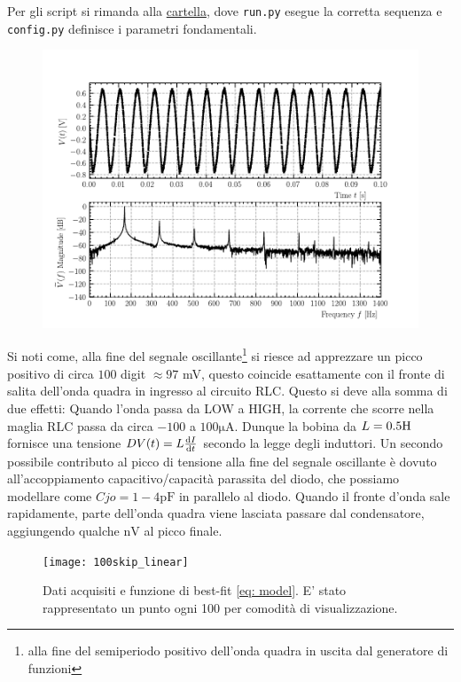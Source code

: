 \documentclass{article}[a4paper, oneside, 11pt]
\begin{document}
Per gli script si rimanda alla 
\href{https://github.com/LucaCiucci/relaz_seme/tree/master/Cartella_fit}
{cartella}, dove \verb+run.py+ esegue la corretta sequenza e \verb+config.py+
definisce i parametri fondamentali.

\begin{figure}[!ht]
\centering
	\includegraphics{phs1_41.pdf}
\label{fig: phs1_41}
\end{figure}
Si noti come, alla fine del segnale oscillante\footnote{alla fine del
semiperiodo positivo dell'onda quadra in uscita dal generatore di funzioni}
si riesce ad apprezzare un picco positivo di circa $100$ digit $\approx 97$ mV,
questo coincide esattamente con il fronte di salita dell'onda quadra in
ingresso al circuito RLC.
Questo si deve alla somma di due effetti: Quando l'onda passa da LOW a
HIGH, la corrente che scorre nella maglia RLC passa da circa $-100$ a
$100 \si{\micro\A}$. Dunque la bobina da $L=0.5 \si{\H}$ fornisce una tensione
$DV(t) = L \frac{\mathrm{d} I}{\mathrm{d} t}$ secondo la legge degli induttori.
Un secondo possibile contributo al picco di tensione alla
fine del segnale oscillante è dovuto all'accoppiamento capacitivo/capacità
parassita del diodo, che possiamo modellare come $Cjo = 1-4 \si{\pico\farad}$
in parallelo al diodo. Quando il fronte d'onda sale rapidamente, parte dell'onda
quadra viene lasciata passare dal condensatore, aggiungendo qualche $\si{\nano\V}$
al picco finale.
\begin{figure}[H]
	\centering 
		\texttt{[image: 100skip\_linear]}
	\caption{Dati acquisiti e funzione di best-fit \eqref{eq: model}. E' 
	stato rappresentato un punto ogni 100 per comodit\`a di visualizzazione.
	\label{fig: sck_lin}}
\end{figure}
\end{document}
